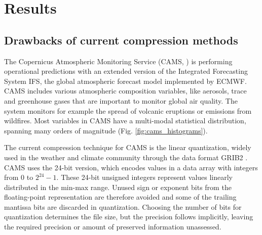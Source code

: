 \section{Results}
\label{sec:compression_results}
\subsection{Drawbacks of current compression methods}

The Copernicus Atmospheric Monitoring Service (CAMS, \cite{Inness2019}) is performing operational predictions with an extended
version of the Integrated Forecasting System IFS, the global atmospheric forecast model implemented by ECMWF.
CAMS includes various atmospheric composition variables, like aerosols, trace and greenhouse gases that are
important to monitor global air quality. The system monitors for example the spread of volcanic eruptions or
emissions from wildfires. Most variables in CAMS have a multi-modal statistical distribution, spanning many
orders of magnitude (Fig. \ref{fig:cams_histograms}).

The current compression technique for CAMS is the linear quantization, widely used in the weather and climate
community through the data format GRIB2 \citep{WMO2003}. CAMS uses the 24-bit version, which encodes values
in a data array with integers from $0$ to $2^{24}-1$. These 24-bit unsigned integers represent values linearly distributed
in the min-max range. Unused sign or exponent bits from the floating-point representation are therefore avoided and
some of the trailing mantissa bits are discarded in quantization. Choosing the number of bits for quantization
determines the file size, but the precision follows implicitly, leaving the required precision or amount of preserved
information unassessed.

